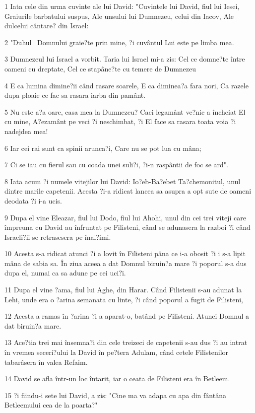\par 1 Iata cele din urma cuvinte ale lui David: "Cuvintele lui David, fiul lui Iesei, Graiurile barbatului suspus, Ale unsului lui Dumnezeu, celui din Iacov, Ale dulcelui cântare? din Israel:
\par 2 "Duhul  Domnului graie?te prin mine, ?i cuvântul Lui este pe limba mea.
\par 3 Dumnezeul lui Israel a vorbit. Taria lui Israel mi-a zis: Cel ce domne?te între oameni cu dreptate, Cel ce stapâne?te cu temere de Dumnezeu
\par 4 E ca lumina dimine?ii când rasare soarele, E ca diminea?a fara nori, Ca razele dupa ploaie ce fac sa rasara iarba din pamânt.
\par 5 Nu este a?a oare, casa mea la Dumnezeu? Caci legamânt ve?nic a încheiat El cu mine, A?ezamânt pe veci ?i neschimbat, ?i El face sa rasara toata voia ?i nadejdea mea!
\par 6 Iar cei rai sunt ca spinii arunca?i, Care nu se pot lua cu mâna;
\par 7 Ci se iau cu fierul sau cu coada unei suli?i, ?i-n raspântii de foc se ard".
\par 8 Iata acum ?i numele vitejilor lui David: Io?eb-Ba?ebet Ta?chemonitul, unul dintre marile capetenii. Acesta ?i-a ridicat lancea sa asupra a opt sute de oameni deodata ?i i-a ucis.
\par 9 Dupa el vine Eleazar, fiul lui Dodo, fiul lui Ahohi, unul din cei trei viteji care împreuna cu David au înfruntat pe Filisteni, când se adunasera la razboi ?i când Israeli?ii se retrasesera pe înal?imi.
\par 10 Acesta s-a ridicat atunci ?i a lovit în Filisteni pâna ce i-a obosit ?i i s-a lipit mâna de sabia sa. În ziua aceea a dat Domnul biruin?a mare ?i poporul s-a dus dupa el, numai ca sa adune pe cei uci?i.
\par 11 Dupa el vine ?ama, fiul lui Aghe, din Harar. Când Filistenii s-au adunat la Lehi, unde era o ?arina semanata cu linte, ?i când poporul a fugit de Filisteni,
\par 12 Acesta a ramas în ?arina ?i a aparat-o, batând pe Filisteni. Atunci Domnul a dat biruin?a mare.
\par 13 Ace?tia trei mai însemna?i din cele treizeci de capetenii s-au dus ?i au intrat în vremea seceri?ului la David în pe?tera Adulam, când cetele Filistenilor tabarâsera în valea Refaim.
\par 14 David se afla într-un loc întarit, iar o ceata de Filisteni era în Betleem.
\par 15 ?i fiindu-i sete lui David, a zis: "Cine ma va adapa cu apa din fântâna Betleemului cea de la poarta?"
